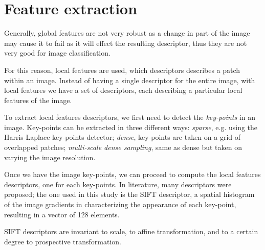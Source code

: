 \section{Feature extraction}

Generally, global features are not very robust as a change in part of the image may cause it to fail as it will effect the resulting descriptor, thus they are not very good for image classification.

For this reason, local features are used, which descriptors describes a patch within an image. Instead of having a single descriptor for the entire image, with local features we have a set of descriptors, each describing a particular local features of the image.

To extract local features descriptors, we first need to detect the \emph{key-points} in an image.
Key-points can be extracted in three different ways: \emph{sparse}, e.g. using the Harris-Laplace key-points detector; \emph{dense}, key-points are taken on a grid of overlapped patches; \emph{multi-scale dense sampling}, same as dense but taken on varying the image resolution.

Once we have the image key-points, we can proceed to compute the local features descriptors, one for each key-points. In literature, many descriptors were proposed; the one used in this study is the SIFT descriptor, a spatial histogram of the image gradients in characterizing the appearance of each key-point, resulting in a vector of 128 elements. 

SIFT descriptors are invariant to scale, to affine transformation, and to a certain degree to prospective transformation.